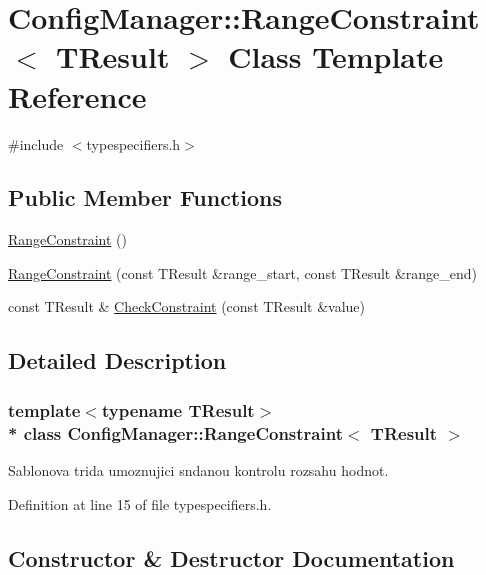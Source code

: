 \hypertarget{class_config_manager_1_1_range_constraint}{}\section{Config\+Manager\+:\+:Range\+Constraint$<$ T\+Result $>$ Class Template Reference}
\label{class_config_manager_1_1_range_constraint}


{\ttfamily \#include $<$typespecifiers.\+h$>$}

\subsection*{Public Member Functions}
\begin{DoxyCompactItemize}
\item 
\hyperlink{class_config_manager_1_1_range_constraint_a262b7a0a4f84d80a57db49aacea8c1ae}{Range\+Constraint} ()
\item 
\hyperlink{class_config_manager_1_1_range_constraint_a2a7a521c7b79ba43f6051592dc2bc61e}{Range\+Constraint} (const T\+Result \&range\+\_\+start, const T\+Result \&range\+\_\+end)
\item 
const T\+Result \& \hyperlink{class_config_manager_1_1_range_constraint_a71057f62a4735e80f1f1faacd7504069}{Check\+Constraint} (const T\+Result \&value)
\end{DoxyCompactItemize}


\subsection{Detailed Description}
\subsubsection*{template$<$typename T\+Result$>$\\*
class Config\+Manager\+::\+Range\+Constraint$<$ T\+Result $>$}

Sablonova trida umoznujici sndanou kontrolu rozsahu hodnot. 

Definition at line 15 of file typespecifiers.\+h.



\subsection{Constructor \& Destructor Documentation}
